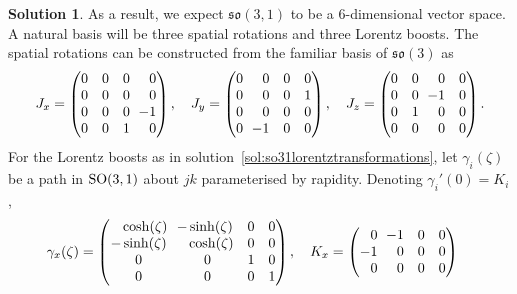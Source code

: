 \documentclass[11pt, a4paper]{report}
\theoremstyle{definition}
\newtheorem{solution}{Solution}[part]
\newenvironment{sol}{\begin{solution}}{\end{solution}\pagebreak[3]}
\newcommand*{\m}{\ensuremath\:\, \mathllap{-}}
\newcommand*{\SO}{\ensuremath\text{SO}}
\begin{document}
\begin{sol}
As a result, we expect $\mathfrak{so}(3, 1)$ to be a 6-dimensional vector space.
A natural basis will be three spatial rotations and three Lorentz boosts.
The spatial rotations can be constructed from the familiar basis of $\mathfrak{so}(3)$ as
\[
    J_x =
        \begin{pmatrix*}[r]
            0 & 0 & 0 & 0 \\
            0 & 0 & 0 & 0 \\
            0 & 0 & 0 & \m 1 \\
            0 & 0 & 1 & 0 \\
        \end{pmatrix*}, \quad
    J_y =
        \begin{pmatrix*}[r]
            0 &    0 & 0 & 0 \\
            0 &    0 & 0 & 1 \\
            0 &    0 & 0 & 0 \\
            0 & \m 1 & 0 & 0 \\
        \end{pmatrix*}, \quad
    J_z =
        \begin{pmatrix*}[r]
            0 & 0 & 0    & 0 \\
            0 & 0 & \m 1 & 0 \\
            0 & 1 & 0    & 0 \\
            0 & 0 & 0    & 0 \\
        \end{pmatrix*}.
\]
For the Lorentz boosts as in solution~\ref{sol:so31lorentztransformations}, let $\gamma_i(\zeta)$ be a path in $\SO(3, 1)$ about $jk$ parameterised by rapidity.
Denoting $\gamma_i'(0) = K_i$,
\begin{align*}
    \gamma_x(\zeta) &=
        \begin{pmatrix}
            \phantom{-}\cosh(\zeta) & \m\sinh(\zeta)           & 0 & 0 \\
            -\sinh(\zeta)           & \phantom{\m}\cosh(\zeta) & 0 & 0 \\
            0                       & 0                        & 1 & 0 \\
            0                       & 0                        & 0 & 1
        \end{pmatrix}, \quad
        K_x = \begin{pmatrix*}[r]
            0  & \m 1 & 0 & 0 \\
            -1 &    0 & 0 & 0 \\
            0  &    0 & 0 & 0 \\

\end{pmatrix*}
\end{align*}
\end{sol}
\end{document}
